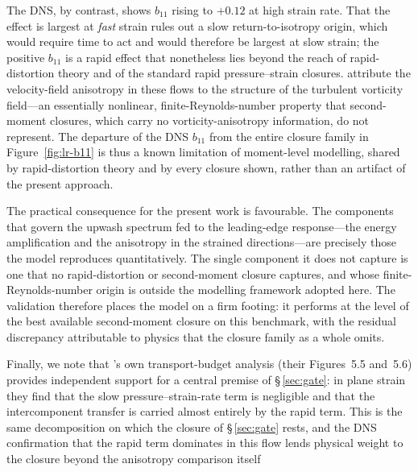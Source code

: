 \documentclass[lineno]{JFM-FLM_Au}
\providecommand{\DIFadd}[1]{{\protect\color{blue}\uwave{#1}}} %
\providecommand{\DIFaddbegin}{} %
\begin{document}
The DNS, by contrast, shows $b_{11}$ rising to $+0.12$ at high strain rate. That
the effect is largest at \emph{fast} strain rules out a slow return-to-isotropy
origin, which would require time to act and would therefore be largest at slow
strain; the positive $b_{11}$ is a rapid effect that nonetheless lies beyond the
reach of rapid-distortion theory and of the standard rapid pressure--strain
closures. \citet{LeeReynolds1985} attribute the velocity-field anisotropy in
these flows to the structure of the turbulent vorticity field---an essentially
nonlinear, finite-Reynolds-number property that second-moment closures, which
carry no vorticity-anisotropy information, do not represent. The departure of the
DNS $b_{11}$ from the entire closure family in Figure~\ref{fig:lr-b11} is thus a
known limitation of moment-level modelling, shared by rapid-distortion theory and
by every closure shown, rather than an artifact of the present approach.

The practical consequence for the present work is favourable. The components that
govern the upwash spectrum fed to the leading-edge response---the energy
amplification and the anisotropy in the strained directions---are precisely those
the model reproduces quantitatively. The single component it does not capture is
one that no rapid-distortion or second-moment closure captures, and whose
finite-Reynolds-number origin is outside the modelling framework adopted here. The
validation therefore places the model on a firm footing: it performs at the level
of the best available second-moment closure on this benchmark, with the residual
discrepancy attributable to physics that the closure family as a whole omits.

Finally, we note that \citeauthor{LeeReynolds1985}'s own transport-budget analysis
(their Figures~5.5 and~5.6) provides independent support for a central premise of
\S\,\ref{sec:gate}: in plane strain they find that the slow pressure--strain-rate
term is negligible and that the intercomponent transfer is carried almost entirely
by the rapid term. This is the same decomposition on which the closure of
\S\,\ref{sec:gate} rests, and the DNS confirmation that the rapid term dominates in
this flow lends physical weight to the closure beyond the anisotropy comparison
itself\DIFaddbegin \DIFadd{.
}








\end{document}

